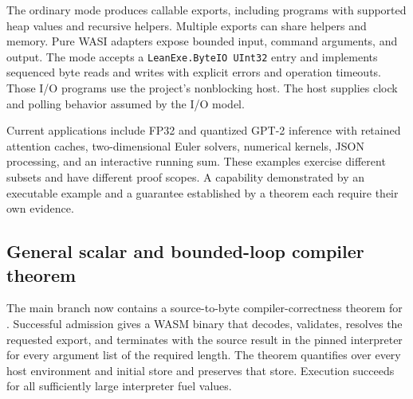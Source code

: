 \documentclass[11pt]{article}
\begin{document}
The ordinary  mode produces callable exports, including programs with supported heap values and recursive helpers.  Multiple exports can share helpers and memory.  Pure WASI adapters expose bounded input, command arguments, and output.  The  mode accepts a \texttt{LeanExe.ByteIO UInt32} entry and implements sequenced byte reads and writes with explicit errors and operation timeouts.  Those I/O programs use the project's nonblocking host.  The host supplies clock and polling behavior assumed by the I/O model.

Current applications include FP32 and quantized GPT-2 inference with retained attention caches, two-dimensional Euler solvers, numerical kernels, JSON processing, and an interactive running sum.  These examples exercise different subsets and have different proof scopes.  A capability demonstrated by an executable example and a guarantee established by a theorem each require their own evidence.

\subsection{General scalar and bounded-loop compiler theorem}

The main branch now contains a source-to-byte compiler-correctness theorem for .  Successful admission gives a WASM binary that decodes, validates, resolves the requested export, and terminates with the source result in the pinned interpreter for every argument list of the required length.  The theorem quantifies over every host environment and initial store and preserves that store.  Execution succeeds for all sufficiently large interpreter fuel values.
\end{document}
